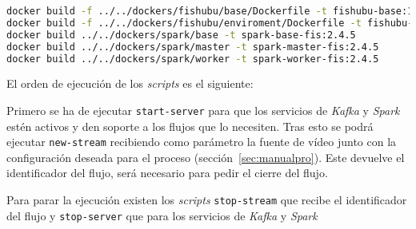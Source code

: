 \begin{lstlisting}[language=Bash]
docker build -f ../../dockers/fishubu/base/Dockerfile -t fishubu-base:1.0.0 ../../
docker build -f ../../dockers/fishubu/enviroment/Dockerfile -t fishubu-env:1.0.0 ../../
docker build ../../dockers/spark/base -t spark-base-fis:2.4.5
docker build ../../dockers/spark/master -t spark-master-fis:2.4.5
docker build ../../dockers/spark/worker -t spark-worker-fis:2.4.5
\end{lstlisting}

El orden de ejecución de los \textit{scripts} es el siguiente:

Primero se ha de ejecutar \texttt{start-server} para que los servicios de \textit{Kafka} y \textit{Spark} estén activos y den soporte a los flujos que lo necesiten. Tras esto se podrá ejecutar \texttt{new-stream} recibiendo como parámetro la fuente de vídeo junto con la configuración deseada para el proceso (sección~\ref{sec:manualpro}). Este devuelve el identificador del flujo, será necesario para pedir el cierre del flujo.

Para parar la ejecución existen los \textit{scripts} \texttt{stop-stream} que recibe el identificador del flujo y \texttt{stop-server} que para los servicios de \textit{Kafka} y \textit{Spark}

